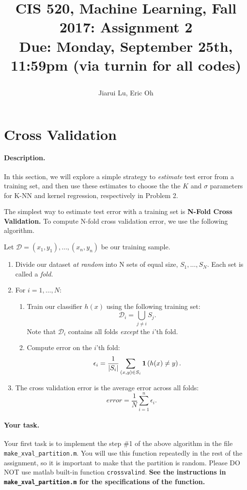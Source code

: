 \documentclass[english]{article}
\title{CIS 520, Machine Learning, Fall 2017: Assignment 2\\
Due: Monday, September 25th, 11:59pm (via turnin for all codes)
\author{Jiarui Lu, Eric Oh}
\ifthenelse{\boolean{ShowSolutions}}{ \\ \bf Solutions }{} }
\date{}
\begin{document}
\maketitle


\section{Cross Validation }

\paragraph{Description.} In this section, we will explore a simple
strategy to {\em estimate} test error from a training set, and then use these estimates to choose the the $K$ and $\sigma$ parameters for
K-NN and kernel regression, respectively in Problem 2.

The simplest way to estimate test error with a training set is {\bf
  N-Fold Cross Validation.} To compute N-fold cross validation error,
we use the following algorithm. 

Let $\mathcal{D} = (x_1, y_1), \dots,
(x_n, y_n)$ be our training sample.
\begin{enumerate}
\item Divide our dataset {\em at random} into N sets of equal size, $S_1, \dots,
  S_N$. Each set is called a {\em fold.}
\item For $i = 1, \dots, N:$ 
  \begin{enumerate}
  \item Train our classifier $h(x)$ using the following training set:
    $$\mathcal{D}_i = \bigcup_{j\ne i} S_j.$$
    Note that $\mathcal{D}_i$ contains all folds {\em except} the $i$'th fold.
  \item Compute error on the $i$'th fold:
    $$\epsilon_i = \frac{1}{|S_i|}\sum_{(x,y) \in S_i} \mathbf{1}\left(h(x) \ne y\right).$$
  \end{enumerate}
\item The cross validation error is the average error across all folds:
  $$error = \frac{1}{N} \sum_{i=1}^n \epsilon_i.$$
\end{enumerate}

\paragraph{Your task.} Your first task is to implement the step \#1 of the above algorithm in the file {\tt make\_xval\_partition.m}. 
You will use this function repeatedly in the rest of the assignment, so it is important to make that the partition is random. 
Please DO NOT use matlab built-in function {\tt crossvalind}. {\bf See the instructions in {\tt make\_xval\_partition.m} for the specifications of the function.}
\end{document}
